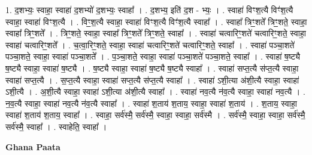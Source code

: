 \documentclass[17pt]{extarticle}
\begin{document}
1. द॒शभ्यः॒ स्वाहा॒ स्वाहा॑ द॒शभ्यो॑ द॒शभ्यः॒ स्वाहा᳚ । . द॒शभ्य॒ इति॑ द॒श - भ्यः॒ । . स्वाहा॑ विꣳश॒त्यै विꣳ॑श॒त्यै स्वाहा॒ स्वाहा॑ विꣳश॒त्यै । . विꣳ॒॒श॒त्यै स्वाहा॒ स्वाहा॑ विꣳश॒त्यै विꣳ॑श॒त्यै स्वाहा᳚ । . स्वाहा᳚ त्रिꣳ॒॒शते᳚ त्रिꣳ॒॒शते॒ स्वाहा॒ स्वाहा᳚ त्रिꣳ॒॒शते᳚ । . त्रिꣳ॒॒शते॒ स्वाहा॒ स्वाहा᳚ त्रिꣳ॒॒शते᳚ त्रिꣳ॒॒शते॒ स्वाहा᳚ । . स्वाहा॑ चत्वारिꣳ॒॒शते॑ चत्वारिꣳ॒॒शते॒ स्वाहा॒ स्वाहा॑ चत्वारिꣳ॒॒शते᳚ । . च॒त्वा॒रिꣳ॒॒शते॒ स्वाहा॒ स्वाहा॑ चत्वारिꣳ॒॒शते॑ चत्वारिꣳ॒॒शते॒ स्वाहा᳚ । . स्वाहा॑ पञ्चा॒शते॑ पञ्चा॒शते॒ स्वाहा॒ स्वाहा॑ पञ्चा॒शते᳚ । . प॒ञ्चा॒शते॒ स्वाहा॒ स्वाहा॑ पञ्चा॒शते॑ पञ्चा॒शते॒ स्वाहा᳚ । . स्वाहा॑ ष॒ष्ट्यै ष॒ष्ट्यै स्वाहा॒ स्वाहा॑ ष॒ष्ट्यै । . ष॒ष्ट्यै स्वाहा॒ स्वाहा॑ ष॒ष्ट्यै ष॒ष्ट्यै स्वाहा᳚ । . स्वाहा॑ सप्त॒त्यै स॑प्त॒त्यै स्वाहा॒ स्वाहा॑ सप्त॒त्यै । . स॒प्त॒त्यै स्वाहा॒ स्वाहा॑ सप्त॒त्यै स॑प्त॒त्यै स्वाहा᳚ । . स्वाहा॑ ऽशी॒त्या अ॑शी॒त्यै स्वाहा॒ स्वाहा॑ ऽशी॒त्यै । . अ॒शी॒त्यै स्वाहा॒ स्वाहा॑ ऽशी॒त्या अ॑शी॒त्यै स्वाहा᳚ । . स्वाहा॑ नव॒त्यै न॑व॒त्यै स्वाहा॒ स्वाहा॑ नव॒त्यै । . न॒व॒त्यै स्वाहा॒ स्वाहा॑ नव॒त्यै न॑व॒त्यै स्वाहा᳚ । . स्वाहा॑ श॒ताय॑ श॒ताय॒ स्वाहा॒ स्वाहा॑ श॒ताय॑ । . श॒ताय॒ स्वाहा॒ स्वाहा॑ श॒ताय॑ श॒ताय॒ स्वाहा᳚ । . स्वाहा॒ सर्व॑स्मै॒ सर्व॑स्मै॒ स्वाहा॒ स्वाहा॒ सर्व॑स्मै । . सर्व॑स्मै॒ स्वाहा॒ स्वाहा॒ सर्व॑स्मै॒ सर्व॑स्मै॒ स्वाहा᳚ । . स्वाहेति॒ स्वाहा᳚ । \newline

\textbf{Ghana Paata } \newline
\end{document}
